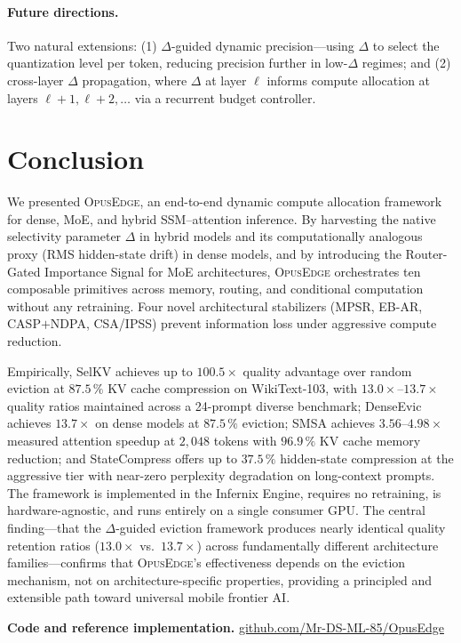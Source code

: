 \documentclass[11pt]{article}
\newcommand{\dsig}{\Delta}
\newcommand{\opusedge}{\textsc{OpusEdge}}
\begin{document}
\paragraph{Future directions.}
Two natural extensions: (1) $\dsig$-guided dynamic precision---using $\dsig$
to select the quantization level per token, reducing precision further in
low-$\dsig$ regimes; and (2) cross-layer $\dsig$ propagation, where $\dsig$
at layer $\ell$ informs compute allocation at layers $\ell+1, \ell+2, \dots$
via a recurrent budget controller.

\section{Conclusion}
We presented \opusedge, an end-to-end dynamic compute allocation framework
for dense, MoE, and hybrid SSM--attention inference. By harvesting the native
selectivity parameter $\dsig$ in hybrid models and its computationally
analogous proxy (RMS hidden-state drift) in dense models, and by introducing
the Router-Gated Importance Signal for MoE architectures, \opusedge{}
orchestrates ten composable primitives across memory, routing, and
conditional computation without any retraining. Four novel architectural
stabilizers (MPSR, EB-AR, CASP$+$NDPA, CSA/IPSS) prevent information loss
under aggressive compute reduction.

Empirically, SelKV achieves up to $100.5\!\times$ quality advantage over
random eviction at $87.5\,\%$ KV cache compression on WikiText-103, with
$13.0\!\times$--$13.7\!\times$ quality ratios maintained across a 24-prompt
diverse benchmark; DenseEvic achieves $13.7\!\times$ on dense models at
$87.5\,\%$ eviction; SMSA achieves $3.56$--$4.98\!\times$ measured attention
speedup at $2{,}048$ tokens with $96.9\,\%$ KV cache memory reduction; and
StateCompress offers up to $37.5\,\%$ hidden-state compression at the
aggressive tier with near-zero perplexity degradation on long-context
prompts. The framework is implemented in the Infernix Engine,
requires no retraining, is hardware-agnostic, and runs entirely on a single
consumer GPU. The central finding---that the $\dsig$-guided eviction
framework produces nearly identical quality retention ratios ($13.0\!\times$
vs.\ $13.7\!\times$) across fundamentally different architecture
families---confirms that \opusedge's effectiveness depends on the eviction
mechanism, not on architecture-specific properties, providing a principled
and extensible path toward universal mobile frontier AI.

\vspace{0.6em}
\noindent\textbf{Code and reference implementation.}
\href{https://github.com/Mr-DS-ML-85/OpusEdge}{github.com/Mr-DS-ML-85/OpusEdge}



\end{document}
